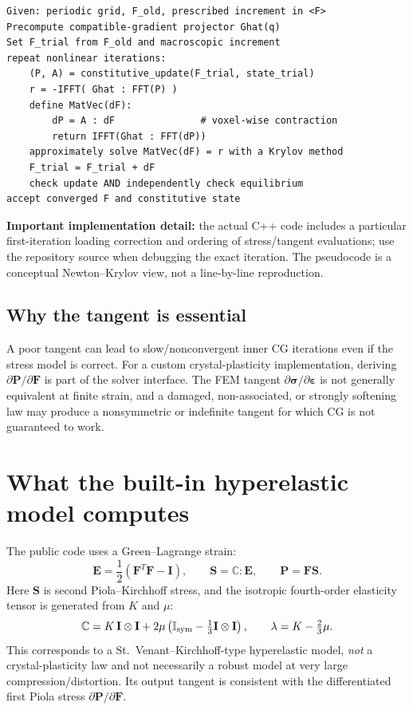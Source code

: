 \documentclass[11pt,a4paper]{article}
\newcommand{\mb}[1]{\boldsymbol{#1}}
\newcommand{\code}[1]{\texttt{\detokenize{#1}}}
\begin{document}
\begin{lstlisting}[style=input,caption={Algorithmic pseudocode for the heterogeneous FFT equilibrium solve (not literal Marlin code).}]
Given: periodic grid, F_old, prescribed increment in <F>
Precompute compatible-gradient projector Ghat(q)
Set F_trial from F_old and macroscopic increment
repeat nonlinear iterations:
    (P, A) = constitutive_update(F_trial, state_trial)
    r = -IFFT( Ghat : FFT(P) )
    define MatVec(dF):
        dP = A : dF               # voxel-wise contraction
        return IFFT(Ghat : FFT(dP))
    approximately solve MatVec(dF) = r with a Krylov method
    F_trial = F_trial + dF
    check update AND independently check equilibrium
accept converged F and constitutive state
\end{lstlisting}
\textbf{Important implementation detail:} the actual C++ code includes a particular first-iteration loading correction and ordering of stress/tangent evaluations; use the repository source when debugging the exact iteration. The pseudocode is a conceptual Newton--Krylov view, not a line-by-line reproduction.

\subsection{Why the tangent is essential}
A poor tangent can lead to slow/nonconvergent inner CG iterations even if the stress model is correct. For a custom crystal-plasticity implementation, deriving $\partial\mathbf P/\partial\mathbf F$ is part of the solver interface. The FEM tangent $\partial\mb\sigma/\partial\mb\varepsilon$ is not generally equivalent at finite strain, and a damaged, non-associated, or strongly softening law may produce a nonsymmetric or indefinite tangent for which CG is not guaranteed to work.

\section{What the built-in hyperelastic model computes}
\label{sec:hyper}
The public \code{HyperElasticIsotropic} code uses a Green--Lagrange strain:
\begin{equation}
\mathbf E=\frac12(\mathbf F^T\mathbf F-\mathbf I),\qquad
\mathbf S=\mathbb C:\mathbf E,\qquad
\mathbf P=\mathbf F\mathbf S.
\end{equation}
Here $\mathbf S$ is second Piola--Kirchhoff stress, and the isotropic fourth-order elasticity tensor is generated from $K$ and $\mu$:
\begin{equation}
\mathbb C=K\,\mathbf I\otimes\mathbf I+2\mu\left(\mathbb I_{\rm sym}-\tfrac13\mathbf I\otimes\mathbf I\right),
\qquad\lambda=K-\tfrac23\mu.
\end{equation}
This corresponds to a St.~Venant--Kirchhoff-type hyperelastic model, \emph{not} a crystal-plasticity law and not necessarily a robust model at very large compression/distortion. Its output tangent is consistent with the differentiated first Piola stress $\partial\mathbf P/\partial\mathbf F$.
\end{document}
